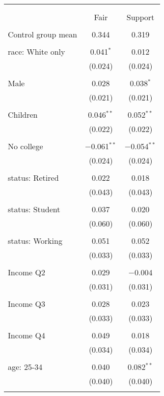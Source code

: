 
\begin{tabular}{@{\extracolsep{5pt}}lcc} 
\\[-1.8ex]\hline 
\hline \\[-1.8ex] 
\\[-1.8ex] & Fair & Support \\ 
\hline \\[-1.8ex] 
 Control group mean & 0.344 & 0.319  \\ \hline \\[-1.8ex] race: White only & 0.041$^{*}$ & 0.012 \\ 
  & (0.024) & (0.024) \\ 
  & & \\ 
 Male & 0.028 & 0.038$^{*}$ \\ 
  & (0.021) & (0.021) \\ 
  & & \\ 
 Children & 0.046$^{**}$ & 0.052$^{**}$ \\ 
  & (0.022) & (0.022) \\ 
  & & \\ 
 No college & $-$0.061$^{**}$ & $-$0.054$^{**}$ \\ 
  & (0.024) & (0.024) \\ 
  & & \\ 
 status: Retired & 0.022 & 0.018 \\ 
  & (0.043) & (0.043) \\ 
  & & \\ 
 status: Student & 0.037 & 0.020 \\ 
  & (0.060) & (0.060) \\ 
  & & \\ 
 status: Working & 0.051 & 0.052 \\ 
  & (0.033) & (0.033) \\ 
  & & \\ 
 Income Q2 & 0.029 & $-$0.004 \\ 
  & (0.031) & (0.031) \\ 
  & & \\ 
 Income Q3 & 0.028 & 0.023 \\ 
  & (0.033) & (0.033) \\ 
  & & \\ 
 Income Q4 & 0.049 & 0.018 \\ 
  & (0.034) & (0.034) \\ 
  & & \\ 
 age: 25-34 & 0.040 & 0.082$^{**}$ \\ 
  & (0.040) & (0.040) \\ 
  & & \\ 

\end{tabular}
